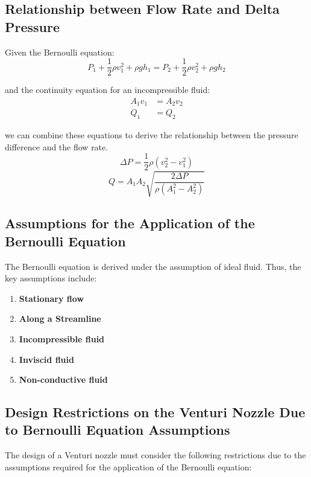 \documentclass{article}
\begin{document}
\small
\subsection{Relationship between Flow Rate and Delta Pressure}
Given the Bernoulli equation:
\begin{equation}
P_1 + \frac{1}{2} \rho v_1^2 + \rho gh_1 = P_2 + \frac{1}{2} \rho v_2^2 + \rho gh_2
\end{equation}

and the continuity equation for an incompressible fluid:
\begin{align}
    A_1 v_1 &= A_2 v_2 \\
    Q_1 &= Q_2
\end{align}

we can combine these equations to derive the relationship between the pressure difference and the flow rate.
\begin{equation}
\Delta P = \frac{1}{2} \rho \left( v_2^2 - v_1^2 \right)
\end{equation}
\begin{equation}
Q = A_1 A_2\sqrt{\frac{2 \Delta P}{\rho \left( A_1^2 - A_2^2 \right)}}
\end{equation}

\subsection{Assumptions for the Application of the Bernoulli Equation}

The Bernoulli equation is derived under the assumption of ideal fluid. Thus, the key assumptions include:

\begin{enumerate}
    \item \textbf{Stationary flow}
    \item \textbf{Along a Streamline}
    \item \textbf{Incompressible fluid}
    \item \textbf{Inviscid fluid}
    \item \textbf{Non-conductive fluid}
    
\end{enumerate}

\subsection{Design Restrictions on the Venturi Nozzle Due to Bernoulli Equation Assumptions}

The design of a Venturi nozzle must consider the following restrictions due to the assumptions required for the application of the Bernoulli equation:
\end{document}

